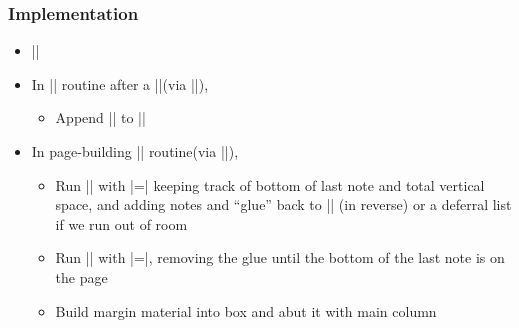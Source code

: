 \documentclass{beamer}
\begin{document}
\begin{frame}[fragile]
  \frametitle{Implementation}
  \begin{itemize}
  \item |\newtoks\marginlist|
    \vskip0.5pc
  \item In |\output| routine after a |\marginpar|{\small (via |\@addmarginpar|)},
    \begin{itemize}
    \item Append || to |\marginlist|
    \end{itemize}
    \vskip0.5pc
  \item In page-building |\output| routine{\small (via |\@combinefloats|)},
    \begin{itemize}
    \item Run |\marginlist| with |\note=\note@down| keeping track of
      bottom of last note and total vertical space, and adding notes
      and ``glue'' back to |\marginlist| (in reverse) or a deferral
      list if we run out of room
    \item Run |\marginlist| with |\note=\note@up|, removing the glue
      until the bottom of the last note is on the page
    \item Build margin material into box and abut it with main column
    \end{itemize}
  \end{itemize}
\end{frame}
\end{document}
